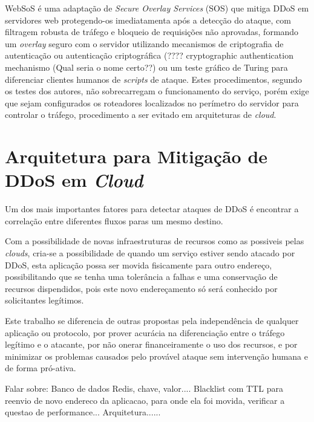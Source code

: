 \documentclass[a4paper, 12pt]{article}
\begin{document}
WebSoS \cite{Stavrou:2005:WOS:1090583.1648614} é uma adaptação de \emph{Secure Overlay Services} (SOS) \cite{Keromytis:2002:SSO:964725.633032} que mitiga DDoS em servidores web protegendo-os imediatamenta após a detecção do ataque, com filtragem robusta de tráfego e bloqueio de requisições não aprovadas, formando um \emph{overlay} seguro com o servidor utilizando mecanismos de criptografia de autenticação ou autenticação criptográfica (???? cryptographic authentication mechanismo (Qual seria o nome certo??) ou um teste gráfico de Turing \cite{Dietrich00analyzingdistributed} para diferenciar clientes humanos de \emph{scripts} de ataque. Estes procedimentos, segundo os testes dos autores, não sobrecarregam o funcionamento do serviço, porém exige que sejam configurados os roteadores localizados no perímetro do servidor para controlar o tráfego, procedimento a ser evitado em arquiteturas de \emph{cloud}.
 



\section{Arquitetura para Mitigação de DDoS em \emph{Cloud}}

Um dos mais importantes fatores para detectar ataques de DDoS é encontrar a correlação entre diferentes fluxos paras um mesmo destino.

Com a possibilidade de novas infraestruturas de recursos como as possiveis pelas \emph{clouds}, cria-se a possibilidade de quando um serviço estiver sendo atacado por DDoS, esta aplicação possa ser movida fisicamente para outro endereço, possibilitando que se tenha uma tolerância a falhas e uma conservação de recursos dispendidos, pois este novo endereçamento só será conhecido por solicitantes legítimos.


Este trabalho se diferencia de outras propostas pela independência de qualquer aplicação ou protocolo, por prover acurácia na diferenciação entre o tráfego legítimo e o atacante, por não onerar financeiramente o uso dos recursos, e por minimizar os problemas causados pelo provável ataque sem intervenção humana e de forma pró-ativa.

Falar sobre:
Banco de dados Redis, chave, valor....
Blacklist com TTL para reenvio de novo endereco da aplicacao, para onde ela foi movida, verificar a questao de performance...
Arquitetura......




% 


\end{document}
